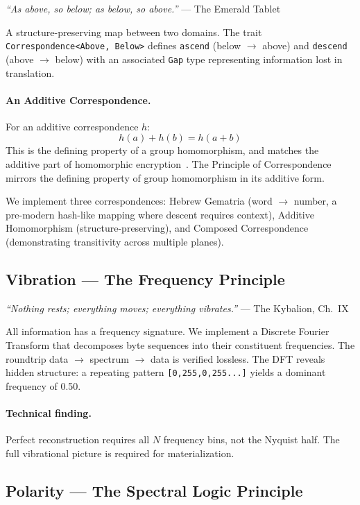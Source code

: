 \documentclass[sigplan,anonymous=false]{acmart}
\begin{document}
\emph{``As above, so below; as below, so above.''} --- The Emerald Tablet~\cite{emerald}

A structure-preserving map between two domains. The trait \texttt{Correspondence<Above, Below>} defines \texttt{ascend} (below $\to$ above) and \texttt{descend} (above $\to$ below) with an associated \texttt{Gap} type representing information lost in translation.

\paragraph{An Additive Correspondence.} For an additive correspondence $h$:
\begin{equation}
  h(a) + h(b) = h(a + b)
\end{equation}
This is the defining property of a group homomorphism, and matches the additive part of homomorphic encryption~\cite{gentry}. The Principle of Correspondence mirrors the defining property of group homomorphism in its additive form.

We implement three correspondences: Hebrew Gematria (word $\to$ number, a pre-modern hash-like mapping where descent requires context), Additive Homomorphism (structure-preserving), and Composed Correspondence (demonstrating transitivity across multiple planes).

\subsection{Vibration --- The Frequency Principle}

\emph{``Nothing rests; everything moves; everything vibrates.''} --- The Kybalion, Ch.~IX

All information has a frequency signature. We implement a Discrete Fourier Transform that decomposes byte sequences into their constituent frequencies. The roundtrip data $\to$ spectrum $\to$ data is verified lossless. The DFT reveals hidden structure: a repeating pattern \texttt{[0,255,0,255...]} yields a dominant frequency of 0.50.

\paragraph{Technical finding.} Perfect reconstruction requires all $N$ frequency bins, not the Nyquist half. The full vibrational picture is required for materialization.

\subsection{Polarity --- The Spectral Logic Principle}
\end{document}
